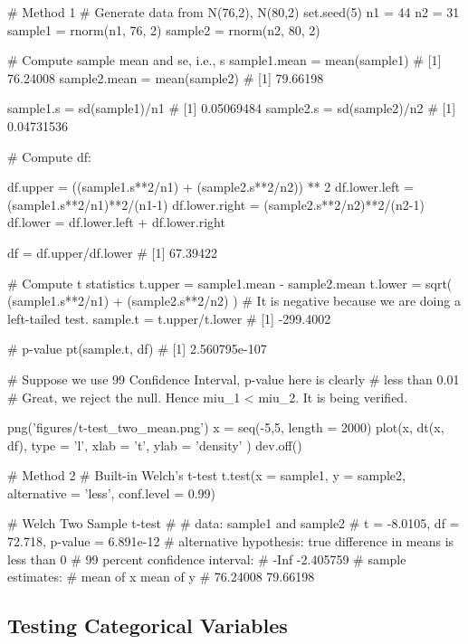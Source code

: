 \documentclass[12pt]{article}
\begin{document}
\begin{rc}

# Method 1
# Generate data from N(76,2), N(80,2)
set.seed(5)
n1 = 44
n2 = 31
sample1 = rnorm(n1, 76, 2)
sample2 = rnorm(n2, 80, 2)


# Compute sample mean and se, i.e., s
sample1.mean = mean(sample1)		# [1] 76.24008
sample2.mean = mean(sample2)		# [1] 79.66198


sample1.s = sd(sample1)/n1			# [1] 0.05069484
sample2.s = sd(sample2)/n2			# [1] 0.04731536


# Compute df:

df.upper = ((sample1.s**2/n1) + (sample2.s**2/n2)) ** 2
df.lower.left = (sample1.s**2/n1)**2/(n1-1)
df.lower.right = (sample2.s**2/n2)**2/(n2-1)
df.lower = df.lower.left + df.lower.right

df = df.upper/df.lower				# [1] 67.39422


# Compute t statistics
t.upper = sample1.mean - sample2.mean
t.lower = sqrt(
		(sample1.s**2/n1) + (sample2.s**2/n2)
)
# It is negative because we are doing a left-tailed test.
sample.t = t.upper/t.lower		# [1] -299.4002

# p-value
pt(sample.t, df)			# [1] 2.560795e-107

# Suppose we use 99 Confidence Interval, p-value here is clearly
# less than 0.01
# Great, we reject the null. Hence miu_1 < miu_2. It is being verified.


png('figures/t-test_two_mean.png')
x = seq(-5,5, length = 2000)
plot(x,
		 dt(x, df),
		 type = 'l',
		 xlab = 't',
		 ylab = 'density'
)
dev.off()


# Method 2
# Built-in Welch's t-test
t.test(x = sample1, y = sample2, alternative = 'less', conf.level = 0.99)



#	        Welch Two Sample t-test
#	
#	data:  sample1 and sample2
#	t = -8.0105, df = 72.718, p-value = 6.891e-12
#	alternative hypothesis: true difference in means is less than 0
#	99 percent confidence interval:
#	      -Inf -2.405759
#	sample estimates:
#	mean of x mean of y
#	 76.24008  79.66198
\end{rc}










\subsection{Testing Categorical Variables}
\end{document}
